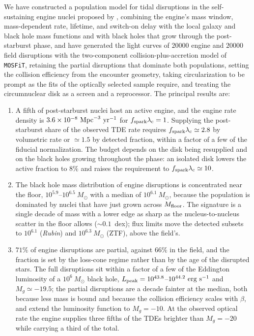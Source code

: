 \documentclass[twocolumn,pdftex]{aastex701}
\newcommand{\msun}{M_{\odot}\xspace}
\newcommand{\mosfit}{{\tt MOSFiT}\xspace}
\newcommand{\lsst}{{\it Rubin}\xspace}
\newcommand{\fspark}{f_{\rm spark}\xspace}
\newcommand{\lamc}{\lambda_{\rm c}\xspace}
\begin{document}
We have constructed a population model for tidal disruptions in the self-sustaining engine nuclei proposed by \citet{Guillochon:2026a}, combining the engine's mass window, mass-dependent rate, lifetime, and switch-on delay with the local galaxy and black hole mass functions and with black holes that grow through the post-starburst phase, and have generated the light curves of $20000$ engine and $20000$ field disruptions with the two-component collision-plus-accretion model of \mosfit, retaining the partial disruptions that dominate both populations, setting the collision efficiency from the encounter geometry, taking circularization to be prompt as the fits of the optically selected sample require, and treating the circumnuclear disk as a screen and a reprocessor. The principal results are:
\begin{enumerate}
\item A fifth of post-starburst nuclei host an active engine, and the engine rate density is $3.6 \times 10^{-8}~{\rm Mpc}^{-3}~{\rm yr}^{-1}$ for $\fspark \lamc = 1$. Supplying the post-starburst share of the observed TDE rate requires $\fspark \lamc \simeq 2.8$ by volumetric rate or $\simeq 1.5$ by detected fraction, within a factor of a few of the fiducial normalization. The budget depends on the disk being resupplied and on the black holes growing throughout the phase: an isolated disk lowers the active fraction to $8\%$ and raises the requirement to $\fspark \lamc \simeq 10$.
\item The black hole mass distribution of engine disruptions is concentrated near the floor, $10^{5.9}$--$10^{6.5}~\msun$ with a median of $10^{6.1}~\msun$, because the population is dominated by nuclei that have just grown across $M_{\rm floor}$. The signature is a single decade of mass with a lower edge as sharp as the nucleus-to-nucleus scatter in the floor allows ($\sim 0.1$~dex); flux limits move the detected subsets to $10^{6.1}$ (\lsst) and $10^{6.3}~\msun$ (ZTF), above the field's.
\item $71\%$ of engine disruptions are partial, against $66\%$ in the field, and the fraction is set by the loss-cone regime rather than by the age of the disrupted stars. The full disruptions sit within a factor of a few of the Eddington luminosity of a $10^{6}~\msun$ black hole, $L_{\rm peak} = 10^{43.8}$--$10^{44.2}~{\rm erg~s^{-1}}$ and $M_g \simeq -19.5$; the partial disruptions are a decade fainter at the median, both because less mass is bound and because the collision efficiency scales with $\beta$, and extend the luminosity function to $M_g = -10$. At the observed optical rate the engine supplies three fifths of the TDEs brighter than $M_g = -20$ while carrying a third of the total.

\end{enumerate}
\end{document}
